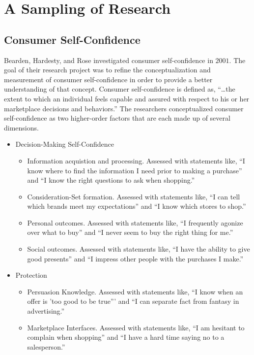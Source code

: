 \section{A Sampling of Research}

\subsection{Consumer Self-Confidence}

Bearden, Hardesty, and Rose investigated consumer self-confidence in $ 2001 $\cite{bearden2001consumer}. The goal of their research project was to refine the conceptualization and measurement of consumer self-confidence in order to provide a better understanding of that concept. Consumer self-confidence is defined as, ``\ldots the extent to which an individual feels capable and assured with respect to his or her marketplace decisions and behaviors.'' The researchers conceptualized consumer self-confidence as two higher-order factors that are each made up of several dimensions.

\begin{itemize}
	\item Decision-Making Self-Confidence
	\begin{itemize}
		\item Information acquistion and processing. Assessed with statements like, ``I know where to find the information I need prior to making a purchase'' and ``I know the right questions to ask when shopping.''
		\item Consideration-Set formation. Assessed with statements like, ``I can tell which brands meet my expectations'' and ``I know which stores to shop.''
		\item Personal outcomes. Assessed with statements like, ``I frequently agonize over what to buy'' and ``I never seem to buy the right thing for me.''
		\item Social outcomes. Assessed with statements like, ``I have the ability to give good presents'' and ``I impress other people with the purchases I make.''
	\end{itemize}
	\item Protection
	\begin{itemize}
		\item Persuasion Knowledge. Assessed with statements like, ``I know when an offer is 'too good to be true''' and ``I can separate fact from fantasy in advertising.''
		\item Marketplace Interfaces. Assessed with statements like, ``I am hesitant to complain when shopping'' and ``I have a hard time saying no to a salesperson.''
	\end{itemize}
\end{itemize}

